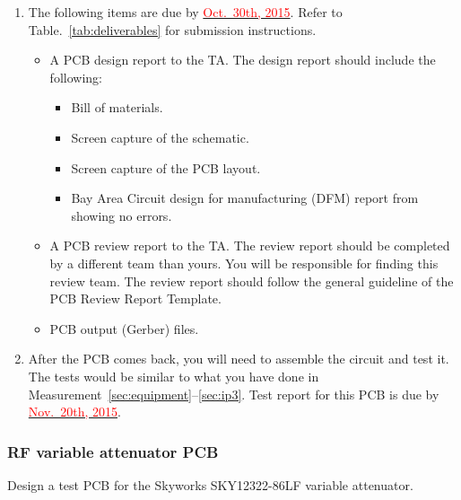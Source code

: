 \documentclass[letterpaper, 11pt]{article}
\newcommand{\due}[1]{\href{https://github.com/ucdart/UCD-EEC134/blob/master/support/schedule/eec134-schedule.pdf}{\textcolor{red}{#1}}}
\begin{document}
\begin{enumerate}
	\item The following items are due by \due{Oct.~30th, 2015}. Refer to Table.~\ref{tab:deliverables} for submission instructions. 
		\begin{itemize}
			\item A PCB design report to the TA. The design report should include the following:
				\begin{itemize}
					\item Bill of materials.
					\item Screen capture of the schematic.
					\item Screen capture of the PCB layout.
					\item Bay Area Circuit design for manufacturing (DFM) report from showing no errors.
				\end{itemize}
			\item A PCB review report to the TA. The review report should be completed by a different team than yours. You will be responsible for finding this review team. The review report should follow the general guideline of the PCB Review Report Template.
			
			\item PCB output (Gerber) files.
		\end{itemize}

	\item After the PCB comes back, you will need to assemble the circuit and test it. The tests would be similar to what you have done in Measurement~\ref{sec:equipment}--\ref{sec:ip3}. Test report for this PCB is due by \due{Nov.~20th, 2015}.

\end{enumerate}
	
\subsubsection{RF variable attenuator PCB}
Design a test PCB for the Skyworks SKY12322-86LF variable attenuator. 
\end{document}
